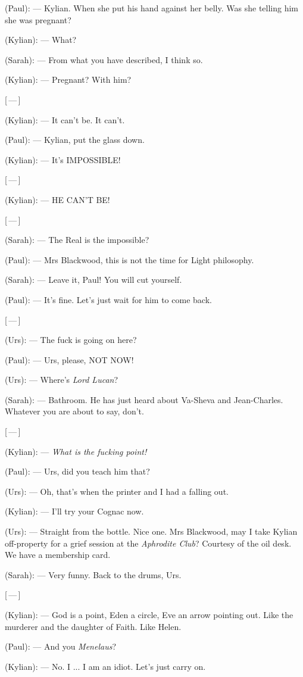 \begin{room}

(Paul): --- Kylian. When she put his hand against her belly. Was she telling him she was pregnant?

(Kylian): --- What?

(Sarah): --- From what you have described, I think so.

(Kylian): --- Pregnant? With him?

\centerline{[\,---\,]}

(Kylian): --- It can't be. It can't.

(Paul): --- Kylian, put the glass down.

(Kylian): --- It's IMPOSSIBLE!

\centerline{[\,---\,]}

(Kylian): --- HE CAN'T BE!

\centerline{[\,---\,]}

(Sarah): --- The Real is the impossible?

(Paul): --- Mrs Blackwood, this is not the time for Light philosophy.

(Sarah): --- Leave it, Paul! You will cut yourself.

(Paul): --- It's fine. Let's just wait for him to come back.

\centerline{[\,---\,]}

(Urs): --- The fuck is going on here?

(Paul): --- Urs, please, NOT NOW!

(Urs): --- Where's \textit{Lord Lucan}?

(Sarah): --- Bathroom. He has just heard about Va-Sheva and Jean-Charles. Whatever you are about to say, don't.

\centerline{[\,---\,]}

(Kylian): --- \textit{What is the fucking point!}

(Paul): --- Urs, did you teach him that?

(Urs): --- Oh, that's when the printer and I had a falling out.

(Kylian): --- I'll try your Cognac now.

(Urs): --- Straight from the bottle. Nice one. Mrs Blackwood, may I take Kylian off-property for a grief session at the \textit{Aphrodite Club}? Courtesy of the oil desk. We have a membership card.

(Sarah): --- Very funny. Back to the drums, Urs.

\centerline{[\,---\,]}

(Kylian): --- God is a point, Eden a circle, Eve an arrow pointing out. Like the murderer and the daughter of Faith. Like Helen.

(Paul): --- And you \textit{Menelaus}?

(Kylian): --- No. I ... I am an idiot. Let's just carry on.

\end{room}


